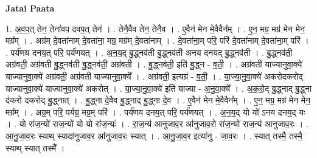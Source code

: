 \documentclass[17pt]{extarticle}
\begin{document}
\textbf{Jatai Paata} \newline

1. अ॒व॒प॒त् तेन॒ तेना॑वप दवप॒त् तेन॑ । . तेनै॒वैव तेन॒ तेनै॒व । . ए॒वैन॑ मेन मे॒वैवैन᳚म् । . ए॒न॒ मग्र॒ मग्र॑ मेन मेन॒ मग्र᳚म् । . अग्र॑म् दे॒वता॑नाम् दे॒वता॑ना॒ मग्र॒ मग्र॑म् दे॒वता॑नाम् । . दे॒वता॑ना॒म् परि॒ परि॑ दे॒वता॑नाम् दे॒वता॑ना॒म् परि॑ । . पर्य॑णय दनय॒त् परि॒ पर्य॑णयत् । . अ॒न॒य॒द् बु॒द्ध्नव॑ती बु॒द्ध्नव॑ती अनय दनयद् बु॒द्ध्नव॑ती । . बु॒द्ध्नव॑ती॒ अग्र॑वती॒ अग्र॑वती बु॒द्ध्नव॑ती बु॒द्ध्नव॑ती॒ अग्र॑वती । . बु॒द्ध्नव॑ती॒ इति॑ बु॒द्ध्न - व॒ती॒ । . अग्र॑वती याज्यानुवा॒क्ये॑ याज्यानुवा॒क्ये॑ अग्र॑वती॒ अग्र॑वती याज्यानुवा॒क्ये᳚ । . अग्र॑वती॒ इत्यग्र॑ - व॒ती॒ । . या॒ज्या॒नु॒वा॒क्ये॑ अकरोदकरोद् याज्यानुवा॒क्ये॑ याज्यानुवा॒क्ये॑ अकरोत् । . या॒ज्या॒नु॒वा॒क्ये॑ इति॑ याज्या - अ॒नु॒वा॒क्ये᳚ । . अ॒क॒रो॒द् बु॒द्ध्नाद् बु॒द्ध्ना द॑करो दकरोद् बु॒द्ध्नात् । . बु॒द्ध्ना दे॒वैव बु॒द्ध्नाद् बु॒द्ध्ना दे॒व । . ए॒वैन॑ मेन मे॒वैवैन᳚म् । . ए॒न॒ मग्र॒ मग्र॑ मेन मेन॒ मग्र᳚म् । . अग्र॒म् परि॒ पर्यग्र॒ मग्र॒म् परि॑ । . पर्य॑णय दनय॒त् परि॒ पर्य॑णयत् । . अ॒न॒य॒द् यो यो॑ ऽनय दनय॒द् यः । . यो रा॑ज॒न्यो॑ राज॒न्यो॑ यो यो रा॑ज॒न्यः॑ । . रा॒ज॒न्य॑ आनुजाव॒र आ॑नुजाव॒रो रा॑ज॒न्यो॑ राज॒न्य॑ आनुजाव॒रः । . आ॒नु॒जा॒व॒रः स्याथ् स्यादा॑नुजाव॒र आ॑नुजाव॒रः स्यात् । . आ॒नु॒जा॒व॒र इत्या॑नु - जा॒व॒रः । . स्यात् तस्मै॒ तस्मै॒ स्याथ् स्यात् तस्मै᳚ । \newline
\end{document}
